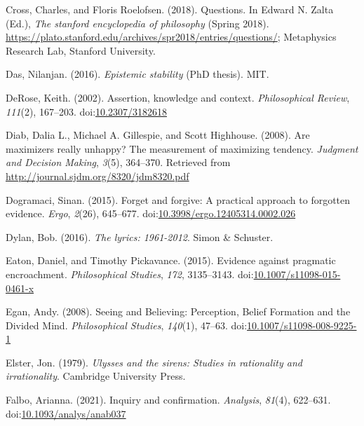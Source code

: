 \documentclass[
  10pt,
  letterpaper,
  twoside]{scrbook}
\newlength{\cslhangindent}
\newenvironment{CSLReferences}[2] %
 {\begin{list}{}{%
  \setlength{\itemindent}{0pt}
  \setlength{\leftmargin}{0pt}
  \setlength{\parsep}{0pt}
  \ifodd #1
   \setlength{\leftmargin}{\cslhangindent}
   \setlength{\itemindent}{-1\cslhangindent}
  \fi
  \setlength{\itemsep}{#2\baselineskip}}}
 {\end{list}}
\begin{document}
\begin{CSLReferences}{1}{0}
Cross, Charles, and Floris Roelofsen. (2018). Questions. In Edward N.
Zalta (Ed.), \emph{The stanford encyclopedia of philosophy} (Spring
2018).
\url{https://plato.stanford.edu/archives/spr2018/entries/questions/};
Metaphysics Research Lab, Stanford University.

Das, Nilanjan. (2016). \emph{Epistemic stability} (PhD thesis). {MIT}.

DeRose, Keith. (2002). Assertion, knowledge and context.
\emph{Philosophical Review}, \emph{111}(2), 167--203.
doi:\href{https://doi.org/10.2307/3182618}{10.2307/3182618}

Diab, Dalia L., Michael A. Gillespie, and Scott Highhouse. (2008). Are
maximizers really unhappy? The measurement of maximizing tendency.
\emph{Judgment and Decision Making}, \emph{3}(5), 364--370. Retrieved
from \url{http://journal.sjdm.org/8320/jdm8320.pdf}

Dogramaci, Sinan. (2015). Forget and forgive: A practical approach to
forgotten evidence. \emph{Ergo}, \emph{2}(26), 645--677.
doi:\href{https://doi.org/10.3998/ergo.12405314.0002.026}{10.3998/ergo.12405314.0002.026}

Dylan, Bob. (2016). \emph{The lyrics: 1961-2012}. Simon \& Schuster.

Eaton, Daniel, and Timothy Pickavance. (2015). Evidence against
pragmatic encroachment. \emph{Philosophical Studies}, \emph{172},
3135--3143.
doi:\href{https://doi.org/10.1007/s11098-015-0461-x}{10.1007/s11098-015-0461-x}

Egan, Andy. (2008). {Seeing and Believing: Perception, Belief Formation
and the Divided Mind}. \emph{Philosophical Studies}, \emph{140}(1),
47--63.
doi:\href{https://doi.org/10.1007/s11098-008-9225-1}{10.1007/s11098-008-9225-1}

Elster, Jon. (1979). \emph{Ulysses and the sirens: Studies in
rationality and irrationality}. Cambridge University Press.

Falbo, Arianna. (2021). Inquiry and confirmation. \emph{Analysis},
\emph{81}(4), 622--631.
doi:\href{https://doi.org/10.1093/analys/anab037}{10.1093/analys/anab037}


\end{CSLReferences}
\end{document}
